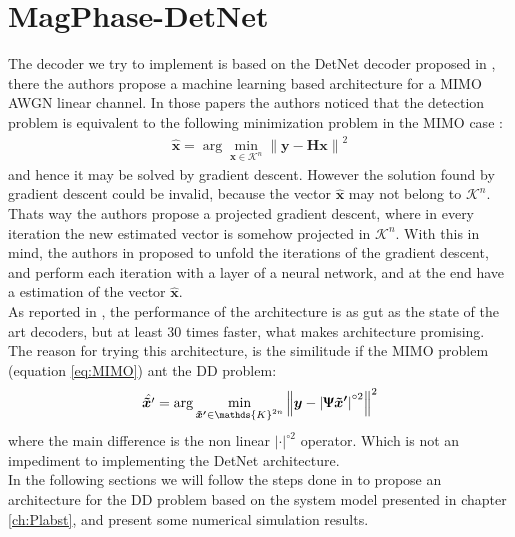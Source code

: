 \chapter{MagPhase-DetNet}
\newcommand{\DetNetImage}[1]{images/DetNet/#1}



The decoder we try to implement is based on the DetNet decoder proposed in \cite{Neev_2017,Neev_2019}, there the authors propose a  machine learning based architecture for a MIMO AWGN linear channel. In those papers the authors noticed that the detection problem is equivalent to the following minimization problem in the MIMO case \cite{Neev_2017}:
\begin{align}
	\hat{\bm x} = \arg \min_{\bm{x} \in \mathcal{K}^{n}} \left\lVert \bm y - \bm{H}\bm{x}  \right\rVert^2
	\label{eq:MIMO}
\end{align}
 and hence it may be solved by gradient descent. However the solution found by gradient descent could be invalid, because the vector $\hat{\bm x}$ may not belong to $\mathcal K^n$. Thats way the authors propose a projected gradient descent, where in every iteration the new estimated vector is somehow projected in $\mathcal K^n$. With this in mind, the authors in \cite{Neev_2017,Neev_2019} proposed to unfold the iterations of the gradient descent, and perform each iteration with a layer of a neural network, and at the end have a estimation of the vector $\hat{\bm x}$.\\
 
As reported in \cite{Neev_2017,Neev_2019}, the performance of the architecture is as gut as the state of the art decoders, but at least 30 times faster, what makes architecture promising.\\

The reason for trying this architecture, is the similitude if the MIMO problem (equation \ref{eq:MIMO}) ant the DD problem:
\begin{align}
	\hat{\bm{\tilde{x}}'} = \arg \min_{\bm{\tilde{x}'} \in \mathds{K}^{2n}} \left\lVert \bm y - \left|\bm{\Uppsi}\bm{\tilde{x}'}  \right|^{\circ2}\right\rVert^2
\end{align}
where the main difference is the non linear $|\cdot|^{\circ2}$ operator. Which is not an impediment to implementing the DetNet architecture.\\

In the following sections we will follow the steps done in \cite{Neev_2019} to propose an architecture for the DD problem based on the system model presented in chapter \ref{ch:Plabst}, and present some numerical simulation results.


